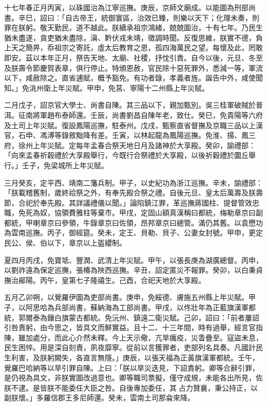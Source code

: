 \begin{pinyinscope}
十七年春正月丙寅，以硃國治為江寧巡撫。庚辰，京師文廟成。以能圖為刑部尚書。辛巳，詔曰：「自古帝王，統御寰區，治效已臻，則樂以天下；化理未奏，則罪在朕躬。敬天勤民，道不越此。朕續承祖宗鴻緒，兢兢圖治，十有七年。乃民生猶未盡遂，貪吏猶未盡除，滇、黔伏戎未靖，徵調時聞。反復思維，朕實不德，負上天之簡畀，忝祖宗之寄託，虛太后教育之恩，孤四海萬民之望。每懷及此，罔敢即安。茲以本年正月，祭告天地、太廟、社稷，抒忱引責。自今以後，元旦、冬至及朕壽令節慶賀表章，俱行停止。特頒恩赦，官民除十惡死罪外，悉減一等，軍流以下，咸赦除之。直省逋賦，概予豁免。有功者錄，孝義者旌。誕告中外，咸使聞知。」免洮州衛上年災賦。甲申，免莒、寧陽十二州縣上年災賦。

二月戊子，詔京官大學士、尚書自陳。其三品以下，親加甄別。吳三桂軍破賊於普洱。征南將軍趙布泰師還。壬辰，尚書劉昌自陳年老，致仕。癸巳，免貴陽等六府及土司上年災賦。復設鳳陽巡撫，駐泰州。戊戌，甄察直省督撫及京職三品以上漢官，石申、馮溥等錄敘黜降有差。壬寅，以林起龍為鳳陽巡撫。免淮、揚、鳳三府，徐州上年災賦。定每年孟春合祭天地日月及諸神於大享殿。癸卯，諭禮部：「向來孟春祈穀禮於大享殿舉行，今既行合祭禮於大享殿，以後祈穀禮於圜丘舉行。」壬子，免梁城所上年災賦。

三月癸亥，定平西、靖南二籓兵制。甲子，以史紀功為浙江巡撫。辛未，諭禮部：「朕載稽舊制，歲終祫祭之外，有奉先殿合祭之禮。自後元旦、皇太后萬壽及朕壽節，合祀於奉先殿。其詳議禮儀以聞。」論陷鎮江罪，革巡撫蔣國柱、提督管效忠職，免死為奴，協領費雅柱等棄市。甲戌，定固山額真漢稱曰都統，梅勒章京曰副都統，甲喇章京曰參領，牛錄章京曰佐領，昂邦章京曰總管。滿仍其舊。以袁懋功為雲南巡撫。丙子，御經筵。癸未，定王、貝勒、貝子、公妻女封號。甲申，更定民公、侯、伯以下，章京以上盔纓制。

夏四月丙戌，免寶坻、豐潤、武清上年災賦。甲午，以張長庚為湖廣總督。丙申，以劉祚遠為保定巡撫，張椿為陜西巡撫。辛丑，詔定匿災不報罪。癸卯，以白秉貞撫治鄖陽。丙午，皇第七子隆禧生。己酉，合祀天地於大享殿。

五月乙卯朔，以覺羅伊圖為吏部尚書。庚申，免綏德、膚施五州縣上年災賦。甲子，以阿思哈為兵部尚書，蘇納海為工部尚書。甲戌，以佟壯年為正藍旗漢軍都統，郭爾泰為鑲白旗蒙古都統。免沅州、鎮遠二衛災賦。己卯，詔曰：「前者屢詔引咎責躬，由今思之，皆具文而鮮實益。且十二、十三年間，時有過舉，經言官指陳，雖加處分，而此心介然未釋。今上天示儆，亢旱癘疫，災眚疊至。寇盜未息，民生困悴。用是深自刻責，夙夜靡寧。從前以言獲罪者，吏部列名具奏。凡國計民生利害，及朕躬闕失，各直言無隱。」庚辰，以張天福為正黃旗漢軍都統。壬午，覺羅巴哈納等以旱引罪自陳。上曰：「朕以旱災迭見，下詔責躬。卿等合辭引罪，是仍視為具文，非朕實圖改過意也。卿等職司票擬，僅守成規，未能各出所見，佐朕不逮。是皆朕不能委任大臣之咎。自後專加委任，其占力贊襄，秉公持正，以副朕懷。」多羅信郡王多尼師還。癸未，雲南土司那侖來降。


\end{pinyinscope}
